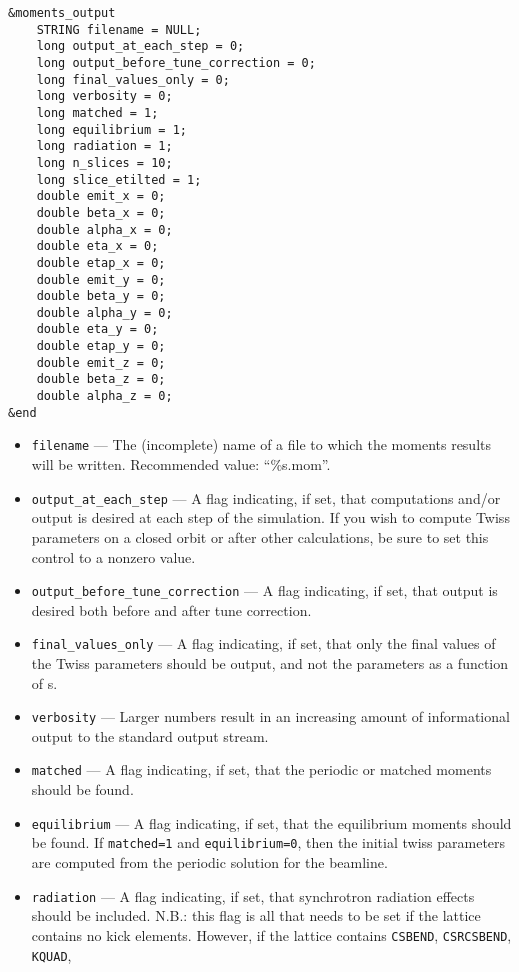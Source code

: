 \documentclass[11pt]{article}
\begin{document}
\begin{verbatim}
&moments_output
    STRING filename = NULL;
    long output_at_each_step = 0;
    long output_before_tune_correction = 0;
    long final_values_only = 0;
    long verbosity = 0;
    long matched = 1;
    long equilibrium = 1;
    long radiation = 1;
    long n_slices = 10;
    long slice_etilted = 1;
    double emit_x = 0;
    double beta_x = 0;
    double alpha_x = 0;
    double eta_x = 0;
    double etap_x = 0;
    double emit_y = 0;
    double beta_y = 0;
    double alpha_y = 0;
    double eta_y = 0;
    double etap_y = 0;
    double emit_z = 0;
    double beta_z = 0;
    double alpha_z = 0;
&end
\end{verbatim}

\begin{itemize}
\item \verb|filename| --- The (incomplete) name of a file to which the moments results will be written.
  Recommended value: ``\%s.mom''.
\item \verb|output_at_each_step| --- A flag indicating, if set, that computations and/or output is desired at each step of the simulation.
  If you wish to compute Twiss parameters on a closed orbit or after other calculations, be sure to set this control to a nonzero value.
\item \verb|output_before_tune_correction| --- A flag indicating, if set, that output is desired both before and after
tune correction.
\item \verb|final_values_only| --- A flag indicating, if set, that only the final values of the Twiss parameters should
be output, and not the parameters as a function of s.
\item \verb|verbosity| --- Larger numbers result in an increasing amount of informational output to the standard output stream.
\item \verb|matched| --- A flag indicating, if set, that the periodic or matched moments should be found.
\item \verb|equilibrium| --- A flag indicating, if set, that the equilibrium moments should be found.  If \verb|matched=1| and \verb|equilibrium=0|,
  then the initial twiss parameters are computed from the periodic solution for the beamline.
\item \verb|radiation| --- A flag indicating, if set, that synchrotron radiation effects should be included.
  N.B.: this flag is all that needs to be set if the lattice contains no kick elements. However, if the lattice contains \verb|CSBEND|, \verb|CSRCSBEND|, \verb|KQUAD|, 

\end{itemize}
\end{document}
